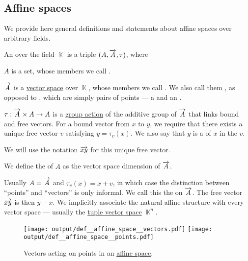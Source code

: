 \subsection{Affine spaces}\label{subsec:affine_spaces}

We provide here general definitions and statements about affine spaces over arbitrary fields.

\begin{definition}\label{def:affine_space}
  An  over the \hyperref[def:field]{field} \( \BbbK \) is a triple \( (A, \overrightarrow{A}, \tau) \), where
  \begin{thmenum}[series=def:affine_space]
     \( A \) is a set, whose members we call .

     \( \overrightarrow{A} \) is a \hyperref[def:vector_space]{vector space} over \( \BbbK \), whose members we call . We also call them , as opposed to , which are simply pairs of points --- a  and an .

     \( \tau: \overrightarrow{A} \times A \to A \) is a \hyperref[def:group_action]{group action} of the additive group of \( \overrightarrow{A} \) that links bound and free vectors. For a bound vector from \( x \) to \( y \), we require that there exists a unique free vector \( v \) satisfying \( y = \tau_v(x) \). We also say that \( y \) is a  of \( x \) in the  \( v \).

    We will use the notation \( \overrightarrow{xy} \) for this unique free vector.
  \end{thmenum}

  We define the  of \( A \) as the vector space dimension of \( \overrightarrow{A} \).

  Usually \( A = \overrightarrow{A} \) and \( \tau_v(x) = x + v \), in which case the distinction between \enquote{points} and \enquote{vectors} is only informal. We call this the  on \( \overrightarrow{A} \). The free vector \( \overrightarrow{xy} \) is then \( y - x \). We implicitly associate the natural affine structure with every vector space --- usually the \hyperref[def:sequence_space]{tuple vector space} \( \BbbK^n \).

  \begin{figure}[!ht]
    \hfill
    \hfill
    \texttt{[image: output/def\_\_affine\_space\_\_vectors.pdf]}
    \hfill
    \texttt{[image: output/def\_\_affine\_space\_\_points.pdf]}
    \hfill
    \caption{Vectors acting on points in an \hyperref[def:affine_space]{affine space}.}\label{fig:def:affine_space}
  \end{figure}
\end{definition}

